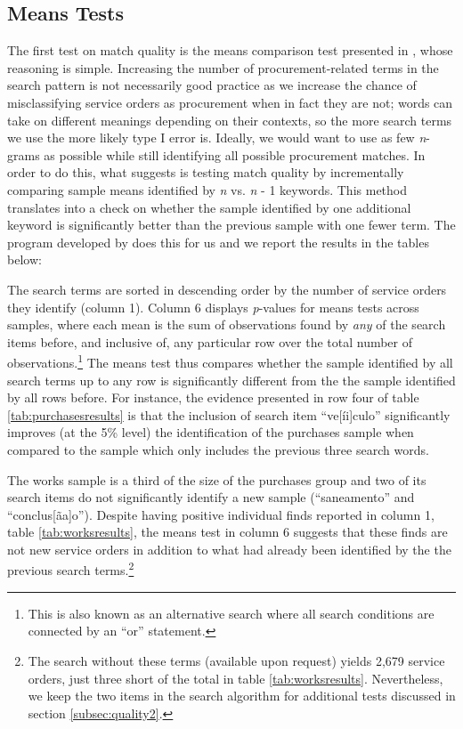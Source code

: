 \documentclass[11pt]{article}
\begin{document}
\subsection{Means Tests}\label{subsec:quality1}

The first test on match quality is the means comparison test presented in \citet{AssumpcaotextfindDataDrivenText2018}, whose reasoning is simple. Increasing the number of procurement-related terms in the search pattern is not necessarily good practice as we increase the chance of misclassifying service orders as procurement when in fact they are not; words can take on different meanings depending on their contexts, so the more search terms we use the more likely type I error is. Ideally, we would want to use as few \emph{n}-grams as possible while still identifying all possible procurement matches. In order to do this, what \citet{AssumpcaotextfindDataDrivenText2018} suggests is testing match quality by incrementally comparing sample means identified by \emph{n} vs. \emph{n} - 1 keywords. This method translates into a check on whether the sample identified by one additional keyword is significantly better than the previous sample with one fewer term. The program developed by \citet{AssumpcaotextfindDataDrivenText2018} does this for us and we report the results in the tables below:



The search terms are sorted in descending order by the number of service orders they identify (column 1). Column 6 displays \emph{p}-values for means tests across samples, where each mean is the sum of observations found by \emph{any} of the search items before, and inclusive of, any particular row over the total number of observations.\footnote{This is also known as an alternative search where all search conditions are connected by an ``or'' statement.} The means test thus compares whether the sample identified by all search terms up to any row is significantly different from the the sample identified by all rows before. For instance, the evidence presented in row four of table \ref{tab:purchasesresults} is that the inclusion of search item ``ve{[}íi{]}culo'' significantly improves (at the 5\% level) the identification of the purchases sample when compared to the sample which only includes the previous three search words.



The works sample is a third of the size of the purchases group and two of its search items do not significantly identify a new sample (``saneamento'' and ``conclus{[}ãa{]}o''). Despite having positive individual finds reported in column 1, table \ref{tab:worksresults}, the means test in column 6 suggests that these finds are not new service orders in addition to what had already been identified by the the previous search terms.\footnote{The search without these terms (available upon request) yields 2,679 service orders, just three short of the total in table \ref{tab:worksresults}. Nevertheless, we keep the two items in the search algorithm for additional tests discussed in section \ref{subsec:quality2}.}
\end{document}

